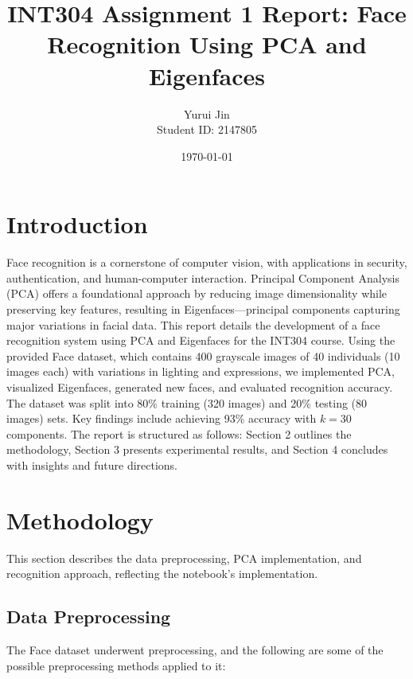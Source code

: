 \documentclass{article}
\title{INT304 Assignment 1 Report: Face Recognition Using PCA and Eigenfaces}
\author{Yurui Jin \\ Student ID: 2147805}
\date{\today}  %
\begin{document}
	
	\maketitle
	
	\section{Introduction}
	Face recognition is a cornerstone of computer vision, with applications in security, authentication, and human-computer interaction. Principal Component Analysis (PCA)\cite{Sirovich1987} offers a foundational approach by reducing image dimensionality while preserving key features, resulting in Eigenfaces—principal components capturing major variations in facial data\cite{Turk1991}\cite{Sirovich1987}. This report details the development of a face recognition system using PCA and Eigenfaces for the INT304 course. Using the provided Face dataset, which contains 400 grayscale images of 40 individuals (10 images each) with variations in lighting and expressions, we implemented PCA, visualized Eigenfaces, generated new faces, and evaluated recognition accuracy. The dataset was split into 80\% training (320 images) and 20\% testing (80 images) sets. Key findings include achieving 93\% accuracy with \( k = 30 \) components. The report is structured as follows: Section 2 outlines the methodology, Section 3 presents experimental results, and Section 4 concludes with insights and future directions.
	
	\section{Methodology}
	This section describes the data preprocessing, PCA implementation, and recognition approach, reflecting the notebook’s implementation.
	\subsection{Data Preprocessing}
	The Face dataset underwent preprocessing, and the following are some of the possible preprocessing methods applied to it:
\end{document}
